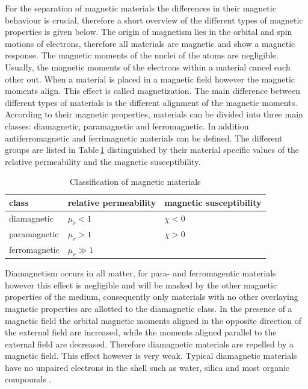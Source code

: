 For the separation of magnetic materials the differences in their magnetic behaviour is crucial, therefore a short overview of the different types of magnetic properties is given below. The origin of magnetism lies in the orbital and spin motions of electrons, therefore all materials are magnetic and show a magnetic response. The magnetic moments of the nuclei of the atoms are negligible. Usually,  the magnetic moments of the electrons within a material cancel each other out. When a material is placed in a magnetic field however the magnetic moments align. This effect is called magnetization. The main difference between different types of materials is the different alignment of the magnetic moments. According to their magnetic properties, materials can be divided into three main classes: diamagnetic, paramagnetic and ferromagnetic. In addition antiferromagnetic and ferrimagnetic materials can be defined. The different groups are listed in Table\,\ref{table:mag_material} distinguished by their material specific values of the relative permeability and the magnetic susceptibility. 

\begin{table}[H]
\centering
\caption{Classification of magnetic materials}
\label{table:mag_material}
\begin{tabular}{lll}\hline
class & relative permeability & magnetic susceptibility \\
\hline\hline
diamagnetic & $\mu_{r}<1$ & $\chi<0$ \\
paramagnetic & $\mu_{r}>1$ & $\chi>0$ \\
ferromagnetic & $\mu_{r}\gg1$ &  \\
\hline
\end{tabular}
\end{table}

Diamagnetism occurs in all matter, for para- and ferromagentic materials however this effect is negligible and will be masked by the other magnetic properties of the medium, consequently only materials with no other overlaying magnetic properties are allotted to the diamagnetic class. In the presence of a magnetic field the orbital magnetic moments aligned in the opposite direction of the external field are increased, while the moments aligned parallel to the external field are decreased. Therefore diamagnetic materials are repelled by a magnetic field. This effect however is very weak. Typical diamagnetic materials have no unpaired electrons in the shell such as water, silica and most organic compounds \cite{svoboda2004magnetic,griffiths2011elektrodynamik}.

